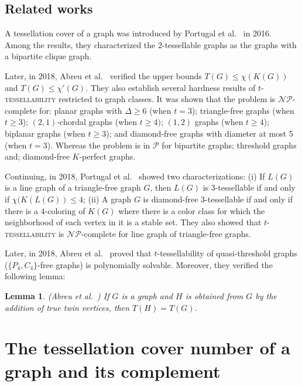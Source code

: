 \documentclass[9pt]{entcs} \usepackage{entcsmacro}
\newtheorem{lema}{Lemma}[section]
\begin{document}
\subsection{Related works}
\label{sec:intropre}

A tessellation cover of a graph was introduced by Portugal et al.~\cite{PSFG16} in 2016. 
Among the results, they characterized the $2$-tessellable graphs as the graphs with a bipartite clique graph.

Later, in 2018, Abreu et al.~\cite{ArLatin} verified the upper bounds $T(G) \leq \chi(K(G))$ and $T(G) \leq \chi'(G)$. 
They also establish several hardness results of \textsc{$t$-tessellability} restricted to graph classes.
It was shown that the problem is $\mathcal{NP}$-complete for: planar graphs with $\Delta \geq 6$ (when $t=3$); triangle-free graphs (when $t\geq 3$); $(2,1)$-chordal graphs (when $t \geq 4)$; $(1,2)$ graphs (when $t \geq 4$); biplanar graphs (when $t \geq 3$); and diamond-free graphs with diameter at most 5 (when $t=3$).
Whereas the problem is in $\mathcal{P}$ for bipartite graphs; threshold graphs and; diamond-free $K$-perfect graphs.

Continuing, in 2018, Portugal et al.~\cite{ArCNMAC} showed two characterizations: (i) If $L(G)$ is a line graph of a triangle-free graph $G$, then $L(G)$ is $3$-tessellable if and only if $\chi(K(L(G)) \leq 4$; (ii) A graph $G$ is diamond-free $3$-tessellable if and only if there is a $4$-coloring of $K(G)$ where there is a color class for which the neighborhood of each vertex in it is a stable set.
They also showed that \textsc{$t$-tessellability} is $\mathcal{NP}$-complete for line graph of triangle-free graphs.

Later, in 2018, Abreu et al.~\cite{ArLAWCG} proved that $t$-tessellability of quasi-threshold graphs ($\{P_4,C_4\}$-free graphs) is polynomially solvable.
Moreover, they verified the following lemma:

\begin{lema}(Abreu et al.~\cite{ArLAWCG})
\label{lema:truetwin}
If $G$ is a graph and $H$ is obtained from $G$ by the addition of true twin vertices, then $T(H) = T(G)$.
\end{lema}



\section{The tessellation cover number of a graph and its complement}\label{sec:preliminaries}
\end{document}
